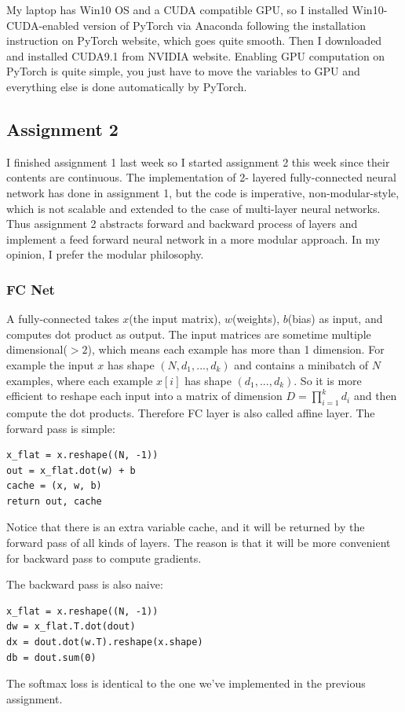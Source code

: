 \documentclass{article} %
\begin{document}
My laptop has Win10 OS and a CUDA compatible GPU, so I installed Win10-CUDA-enabled version of PyTorch via Anaconda following the installation instruction on PyTorch website, which goes quite smooth. Then I downloaded and installed CUDA9.1 from NVIDIA website. Enabling GPU computation on PyTorch is quite simple, you just have to move the variables to GPU and everything else is done automatically by PyTorch.

\subsection{Assignment 2}
I finished assignment 1 last week so I started assignment 2 this week since their contents are continuous. The implementation of 2- layered fully-connected neural network has done in assignment 1, but the code is imperative, non-modular-style, which is not scalable and extended to the case of multi-layer neural networks. Thus assignment 2 abstracts forward and backward process of layers and implement a feed forward neural network in a more modular approach. In my opinion, I prefer the modular philosophy.

\subsubsection{FC Net}
A fully-connected takes $x$(the input matrix), $w$(weights), $b$(bias) as input, and computes dot product as output. The input matrices are sometime multiple dimensional($> 2$), which means each example has more than 1 dimension. For example the input $x$ has shape $(N, d_1, ..., d_k)$ and contains a minibatch of $N$ examples, where each example $x[i]$ has shape $(d_1, ..., d_k)$. So it is more efficient to reshape each input into a matrix of dimension $D=\prod_{i=1}^k d_i$ and then compute the dot products. Therefore FC layer is also called affine layer. The forward pass is simple:
\begin{lstlisting}
x_flat = x.reshape((N, -1))
out = x_flat.dot(w) + b
cache = (x, w, b)
return out, cache
\end{lstlisting}
Notice that there is an extra variable cache, and it will be returned by the forward pass of all kinds of layers. The reason is that it will be more convenient for backward pass to compute gradients.

The backward pass is also naive:
\begin{lstlisting}
x_flat = x.reshape((N, -1))
dw = x_flat.T.dot(dout)
dx = dout.dot(w.T).reshape(x.shape)
db = dout.sum(0)
\end{lstlisting}
The softmax loss is identical to the one we've implemented in the previous assignment.
\end{document}
